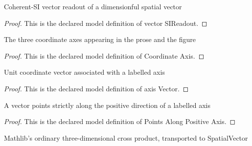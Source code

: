 \begin{definition}
  \label{def:physics:phyx-mini-0609:phyxminiproblems-problemphyxmini0609-vectorsireadout}
  Coherent-SI vector readout of a dimensionful spatial vector
\end{definition}
\begin{proof}
  This is the declared model definition of vector SIReadout.
\end{proof}
\begin{definition}
  \label{def:physics:phyx-mini-0609:phyxminiproblems-problemphyxmini0609-coordinateaxis}
  The three coordinate axes appearing in the prose and the figure
\end{definition}
\begin{proof}
  This is the declared model definition of Coordinate Axis.
\end{proof}
\begin{definition}
  \label{def:physics:phyx-mini-0609:phyxminiproblems-problemphyxmini0609-axisvector}
  Unit coordinate vector associated with a labelled axis
\end{definition}
\begin{proof}
  This is the declared model definition of axis Vector.
\end{proof}
\begin{definition}
  \label{def:physics:phyx-mini-0609:phyxminiproblems-problemphyxmini0609-pointsalongpositiveaxis}
  A vector points strictly along the positive direction of a labelled axis
\end{definition}
\begin{proof}
  This is the declared model definition of Points Along Positive Axis.
\end{proof}
\begin{definition}
  \label{def:physics:phyx-mini-0609:phyxminiproblems-problemphyxmini0609-spatialcross}
  Mathlib's ordinary three-dimensional cross product, transported to SpatialVector
\end{definition}
